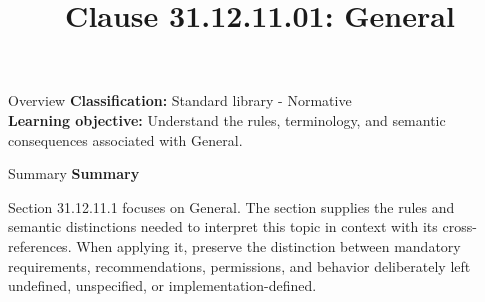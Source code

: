 \documentclass[10pt,letterpaper]{article}
\title{Clause 31.12.11.01: General}
\author{}
\date{}
\begin{document}
\maketitle
\begin{CornellOverviewBox}{Overview}
\textbf{Classification:} Standard library - Normative\\[2pt]
\textbf{Learning objective:} Understand the rules, terminology, and semantic consequences associated with General.
\end{CornellOverviewBox}\begin{CornellSummaryBox}{Summary}
{\sffamily\bfseries\color{Accent} Summary}\par\vspace{3pt}Section 31.12.11.1 focuses on General. The section supplies the rules and semantic distinctions needed to interpret this topic in context with its cross-references. When applying it, preserve the distinction between mandatory requirements, recommendations, permissions, and behavior deliberately left undefined, unspecified, or implementation-defined.
\end{CornellSummaryBox}
\end{document}
